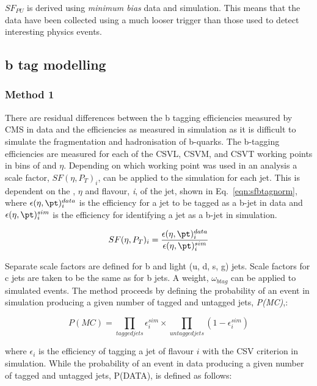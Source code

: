 $SF_{PU}$ is derived using \emph{minimum bias} data and simulation. This means that the data have been collected using a much looser trigger than those used to detect interesting physics events. 

\subsection{b tag modelling ~\label{sec:btagModelling}}

\subsubsection{Method 1 ~\label{subsec:method1btag}}
There are residual differences between the b tagging efficiencies measured by CMS in data and the efficiencies as measured in simulation as it is difficult to simulate the fragmentation and hadronisation of b-quarks. 
The b-tagging efficiencies are measured for each of the CSVL, CSVM, and CSVT working points in bins of \pt and $\eta$. Depending on which working point was used in an analysis a scale factor, $SF(\eta, P_{T})_{i}$,  can be applied to the simulation for each jet. This is dependent on the \pt, $\eta$ and flavour, \emph{i}, of the jet, shown in Eq.~\ref{eqn:sfbtagnorm}, where $\epsilon(\eta , \pt)^{data}_{i}$ is the efficiency for a jet to be tagged as a b-jet in data and $\epsilon(\eta , \pt)^{sim}_{i}$ is the efficiency for identifying a jet as a b-jet in simulation.

\begin{centering}
\begin{equation}
SF(\eta, P_{T})_{i} = \frac{\epsilon(\eta , \pt)^{data}_{i}}{\epsilon(\eta , \pt)^{sim}_{i}}
\label{eqn:sfbtagnorm}
\end{equation}
\end{centering}
Separate scale factors are defined for b and light (u, d, s, g) jets. Scale factors for c jets are taken to be the same as for b jets. A weight, $\omega_{btag}$ can be applied to simulated events. The method proceeds by defining the probability of an event in simulation producing a given number of tagged and untagged jets, \emph{P(MC)},:

\begin{centering}
\begin{equation}
P(MC) = \prod_{tagged jets}\epsilon^{sim}_{i} \times \prod_{untagged jets}(1- \epsilon^{sim}_{i})
\end{equation}
\end{centering}
where $\epsilon_{i}$ is the efficiency of tagging a jet of flavour $i$ with the CSV criterion in simulation. While the probability of an event in data producing a given number of tagged and untagged jets, P(DATA), is defined as follows:


